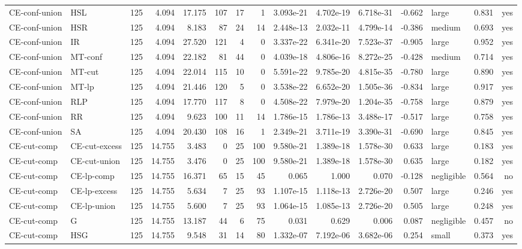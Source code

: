 \begin{table}[htbp]
\begin{tabular}{llrrrrrrrrrrlrr}
CE-conf-union & HSL & 125 & 4.094 & 17.175 & 107 & 17 & 1 & 3.093e-21 & 4.702e-19 & 6.718e-31 & -0.662 & large & 0.831 & yes \\
CE-conf-union & HSR & 125 & 4.094 & 8.183 & 87 & 24 & 14 & 2.448e-13 & 2.032e-11 & 4.799e-14 & -0.386 & medium & 0.693 & yes \\
CE-conf-union & IR & 125 & 4.094 & 27.520 & 121 & 4 & 0 & 3.337e-22 & 6.341e-20 & 7.523e-37 & -0.905 & large & 0.952 & yes \\
CE-conf-union & MT-conf & 125 & 4.094 & 22.182 & 81 & 44 & 0 & 4.039e-18 & 4.806e-16 & 8.272e-25 & -0.428 & medium & 0.714 & yes \\
CE-conf-union & MT-cut & 125 & 4.094 & 22.014 & 115 & 10 & 0 & 5.591e-22 & 9.785e-20 & 4.815e-35 & -0.780 & large & 0.890 & yes \\
CE-conf-union & MT-lp & 125 & 4.094 & 21.446 & 120 & 5 & 0 & 3.538e-22 & 6.652e-20 & 1.505e-36 & -0.834 & large & 0.917 & yes \\
CE-conf-union & RLP & 125 & 4.094 & 17.770 & 117 & 8 & 0 & 4.508e-22 & 7.979e-20 & 1.204e-35 & -0.758 & large & 0.879 & yes \\
CE-conf-union & RR & 125 & 4.094 & 9.623 & 100 & 11 & 14 & 1.786e-15 & 1.786e-13 & 3.488e-17 & -0.517 & large & 0.758 & yes \\
CE-conf-union & SA & 125 & 4.094 & 20.430 & 108 & 16 & 1 & 2.349e-21 & 3.711e-19 & 3.390e-31 & -0.690 & large & 0.845 & yes \\
CE-cut-comp & CE-cut-excess & 125 & 14.755 & 3.483 & 0 & 25 & 100 & 9.580e-21 & 1.389e-18 & 1.578e-30 & 0.633 & large & 0.183 & yes \\
CE-cut-comp & CE-cut-union & 125 & 14.755 & 3.476 & 0 & 25 & 100 & 9.580e-21 & 1.389e-18 & 1.578e-30 & 0.635 & large & 0.182 & yes \\
CE-cut-comp & CE-lp-comp & 125 & 14.755 & 16.371 & 65 & 15 & 45 & 0.065 & 1.000 & 0.070 & -0.128 & negligible & 0.564 & no \\
CE-cut-comp & CE-lp-excess & 125 & 14.755 & 5.634 & 7 & 25 & 93 & 1.107e-15 & 1.118e-13 & 2.726e-20 & 0.507 & large & 0.246 & yes \\
CE-cut-comp & CE-lp-union & 125 & 14.755 & 5.600 & 7 & 25 & 93 & 1.064e-15 & 1.085e-13 & 2.726e-20 & 0.505 & large & 0.248 & yes \\
CE-cut-comp & G & 125 & 14.755 & 13.187 & 44 & 6 & 75 & 0.031 & 0.629 & 0.006 & 0.087 & negligible & 0.457 & no \\
CE-cut-comp & HSG & 125 & 14.755 & 9.548 & 31 & 14 & 80 & 1.332e-07 & 7.192e-06 & 3.682e-06 & 0.254 & small & 0.373 & yes \\

\end{tabular}
\end{table}
